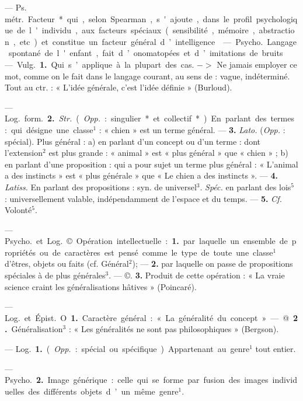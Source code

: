 
	\begin{itemize}[leftmargin=1cm, label=, itemsep=1pt]
 — \si{Ps. métr.} Facteur*
qui, selon Spearman, s'ajoute, dans
le profil psychologique de l'individu,
aux facteurs spéciaux (sensibilité,
mémoire, abstraction, etc.) et constitue un facteur général d’intelligence.

 — \si{Psycho.} Langage spontané de l'enfant, fait d’onomatopées
et d’imitations de bruits.

 — \si{Vulg.} {\bf 1.} Qui s’applique
à la plupart des cas. $->$ Ne jamais
employer ce mot, comme on le fait
dans le langage courant, au sens
de : vague, indéterminé. Tout au ctr. :
« L'idée générale, c’est l’idée définie »
(Burloud).

— \si{Log.} \si{form.} {\bf 2.} {\it Str.} ({\it Opp.} :
singulier* et collectif*). En parlant
des termes : qui désigne une classe$^1$ :
« chien » est un terme général. —
 {\bf 3.} {\it Lato.} ({\it Opp.} : spécial). Plus général : a) en parlant d’un concept ou
d’un terme : dont l'extension$^2$ est
plus grande : « animal » est « plus
général » que « chien » ; b) en parlant d'une proposition : qui a pour
sujet un terme plus général : « L’animal a des instincts » est « plus générale » que « Le chien a des instincts ».
— {\bf 4.} {\it Latiss.} En parlant des propositions : syn. de universel$^3$. {\it Spéc.} en
parlant des lois$^5$ : universellement
valable, indépendamment de l’espace
et du temps. — {\bf 5.} {\it Cf.} Volonté$^5$.

 — \si{Psycho.} et \si{Log.}
©. Opération intellectuelle : {\bf 1.} par
laquelle un ensemble de propriétés
ou de caractères est pensé comme le
type de toute une classe$^1$ d'êtres,
objets ou faits (cf. Général$^2$); — {\bf 2.}
par laquelle on passe de propositions spéciales à de plus générales$^3$.
— ©. {\bf 3.} Produit de cette opération :
« La vraie science craint les généralisations hâtives » (Poincaré).

 — \si{Log.} et \si{Épist.} O. {\bf 1.} Caractère général : « La généralité du
concept ». — @. {\bf 2.} Généralisation$^3$ :
« Les généralités ne sont pas philosophiques » (Bergson).

 — \si{Log.} {\bf 1.} ({\it Opp.} : spécial
ou spécifique). Appartenant au
genre$^1$ tout entier.

— \si{Psycho.} {\bf 2.} Image générique :
celle qui se forme par fusion des
images individuelles des différents
objets d’un même genre$^1$.


\end{itemize}
